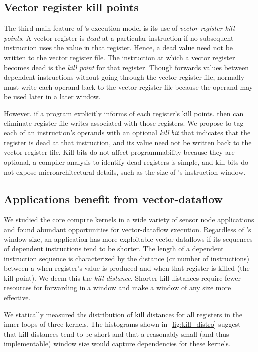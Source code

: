 \subsection{Vector register kill points}

The third main feature of \manic's execution model is its use of {\em vector
register kill points}.  A vector register is {\em dead} at a particular
instruction if no subsequent instruction uses the value in that register.
Hence, a dead value need not be written to the vector register file.
%
The instruction at which a vector register becomes dead is the {\em kill point}
for that register.
%
Though \manic forwards values between dependent instructions without
going through the vector register file,
\manic normally must write each operand back
to the vector register file because the operand may be
used later in a later window.

However, if a program explicitly informs \manic of each register's kill
points, then \manic can eliminate register file writes associated with those
registers. We propose to tag each of an instruction's operands  with an
optional {\em kill bit} that indicates that the register
is dead at that instruction, and its value need not be written back to the
vector register file.  Kill bits do
not affect programmability because they are optional, a compiler analysis to
identify dead registers is simple, and kill bits do not expose 
microarchitectural details, such as the size of \manic's instruction
window. 
%

\subsection{Applications benefit from vector-dataflow}
We studied the core compute kernels in a wide variety of sensor
node applications and found abundant opportunities for vector-dataflow execution.
%
Regardless of \manic's window size, an application has more exploitable vector
dataflows if its sequences of dependent instructions tend to be shorter.
%
The length of a dependent instruction sequence is characterized by the distance (or number of instructions) between a when register's value is produced and when that register is killed (the kill point).
%
We deem this the \emph{kill distance}.
%
Shorter kill distances require fewer
resources for forwarding in a window and make a window of any size more effective.
%

\figMANICKillDistro

We statically measured the distribution of kill distances for all registers in the
inner loops of three kernels. 
% 
The histograms shown in~\autoref{fig:kill_distro} suggest that kill distances tend to be short and that a reasonably small (and thus implementable) window size would capture dependencies for these kernels.

